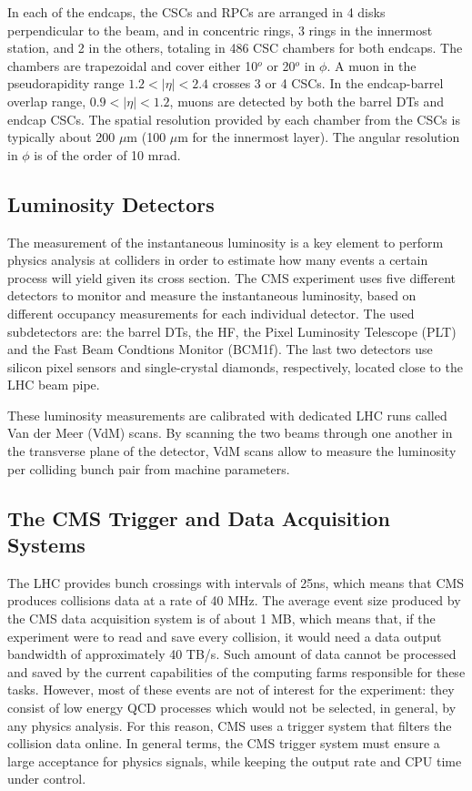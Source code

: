 In each of the endcaps, the CSCs and RPCs are arranged in 4 disks perpendicular to the beam, and in concentric rings, 3 rings in the innermost station, and 2 in the others, totaling in 486 CSC chambers for both endcaps. 
The chambers are trapezoidal and cover either 10$^{o}$ or 20$^{o}$ in $\phi$. 
A muon in the pseudorapidity range $1.2 < |\eta | < 2.4$ crosses 3 or 4 CSCs. 
In the endcap-barrel overlap range, $0.9 < |\eta | < 1.2$, muons are detected by both the barrel DTs and endcap CSCs. 
The spatial resolution provided by each chamber from the CSCs is typically about 200 $\mu$m (100 $\mu$m for the innermost layer). The angular resolution in $\phi$ is of the order of 10 mrad.

\subsection{Luminosity Detectors}

The measurement of the instantaneous luminosity is a key element to perform physics analysis at colliders in order to estimate how many events a certain process will yield given its cross section. 
The CMS experiment uses five different detectors to monitor and measure the instantaneous luminosity, based on different occupancy measurements for each individual detector. 
The used subdetectors are: the barrel DTs, the HF, the Pixel Luminosity Telescope (PLT) and the Fast Beam Condtions Monitor (BCM1f). 
The last two detectors use silicon pixel sensors and single-crystal diamonds, respectively, located close to the LHC beam pipe. 

These luminosity measurements are calibrated with dedicated LHC runs called Van der Meer (VdM) scans. 
By scanning the two beams through one another in the transverse plane of the detector, VdM scans allow to measure the luminosity per colliding bunch pair from machine parameters. 

\subsection{The CMS Trigger and Data Acquisition Systems}

The LHC provides bunch crossings with intervals of 25ns, which means that CMS produces collisions data at a rate of 40 MHz. 
The average event size produced by the CMS data acquisition system is of about 1 MB, which means that, if the experiment were to read and save every collision, it would need a data output bandwidth of approximately 40 TB/s. 
Such amount of data cannot be processed and saved by the current capabilities of the computing farms responsible for these tasks. 
However, most of these events are not of interest for the experiment: they consist of low energy QCD processes which would not be selected, in general, by any physics analysis. 
For this reason, CMS uses a trigger system that filters the collision data online. 
In general terms, the CMS trigger system must ensure a large acceptance for physics signals, while keeping the output rate and CPU time under control.

